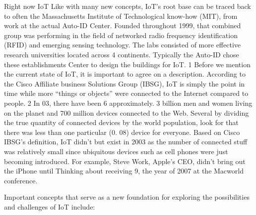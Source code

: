 Right now IoT Like with many new concepts, IoT’s root base can be traced back to often the Massachusetts Institute of Technological know-how (MIT), from work at the actual Auto-ID Center. Founded throughout 1999, that combined group was performing in the field of networked radio frequency identification (RFID) and emerging sensing technology. The labs consisted of more effective research universities located across 4 continents. Typically the Auto-ID chose these establishments Center to design the buildings for IoT. 1 Before we mention the current state of IoT, it is important to agree on a description. According to the Cisco Affiliate business Solutions Group (IBSG), IoT is simply the point in time while more “things or objects” were connected to the Internet compared to people. 2 In 03, there have been 6 approximately. 3 billion men and women living on the planet and 700 million devices connected to the Web. Several by dividing the true quantity of connected devices by the world population, look for that there was less than one particular (0. 08) device for everyone. Based on Cisco IBSG’s definition, IoT didn’t but exist in 2003 as the number of connected stuff was relatively small since ubiquitous devices such as cell phones were just becoming introduced. For example, Steve Work, Apple’s CEO, didn’t bring out the iPhone until Thinking about receiving 9, the year of 2007 at the Macworld conference.

Important concepts that serve as a new foundation for exploring the possibilities and challenges of IoT include:


